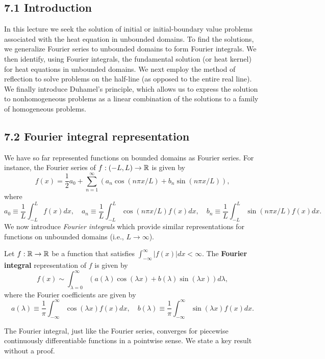 

\subsection{7.1 Introduction}
In this lecture we seek the solution of initial or initial-boundary value problems associated with the heat equation in unbounded domains. To find the solutions, we generalize Fourier series to unbounded domains to form Fourier integrals. We then identify, using Fourier integrals, the fundamental solution (or heat kernel) for heat equations in unbounded domains. We next employ the method of reflection to solve problems on the half-line (as opposed to the entire real line). We finally introduce Duhamel's principle, which allows us to express the solution to nonhomogeneous problems as a linear combination of the solutions to a family of homogeneous problems.

\subsection{7.2 Fourier integral representation}
We have so far represented functions on bounded domains as Fourier series. For instance, the Fourier series of $f : (-L, L) \to \mathbb{R}$ is given by
\[f(x) = \frac{1}{2} a_0 + \sum_{n=1}^{\infty} \left(a_n \cos(n\pi x/L) + b_n \sin(n\pi x/L)\right),\]
where
\[a_0 \equiv \frac{1}{L} \int_{-L}^{L} f(x) dx, \quad a_n \equiv \frac{1}{L} \int_{-L}^{L} \cos(n\pi x/L) f(x) dx, \quad b_n \equiv \frac{1}{L} \int_{-L}^{L} \sin(n\pi x/L) f(x) dx.\]
We now introduce \textit{Fourier integrals} which provide similar representations for functions on unbounded domains (i.e., $L \to \infty$).

\begin{definition}
    Let $f : \mathbb{R} \to \mathbb{R}$ be a function that satisfies $\int_{-\infty}^{\infty} |f(x)| dx < \infty$. The \textbf{Fourier integral} representation of $f$ is given by
    \[f(x) \sim \int_{\lambda=0}^{\infty} \left(a(\lambda) \cos(\lambda x) + b(\lambda) \sin(\lambda x)\right) d\lambda,\]
    where the Fourier coefficients are given by
    \[a(\lambda) \equiv \frac{1}{\pi} \int_{-\infty}^{\infty} \cos(\lambda x) f(x) dx, \quad b(\lambda) \equiv \frac{1}{\pi} \int_{-\infty}^{\infty} \sin(\lambda x) f(x) dx.\]
\end{definition}

The Fourier integral, just like the Fourier series, converges for piecewise continuously differentiable functions in a pointwise sense. We state a key result without a proof.

